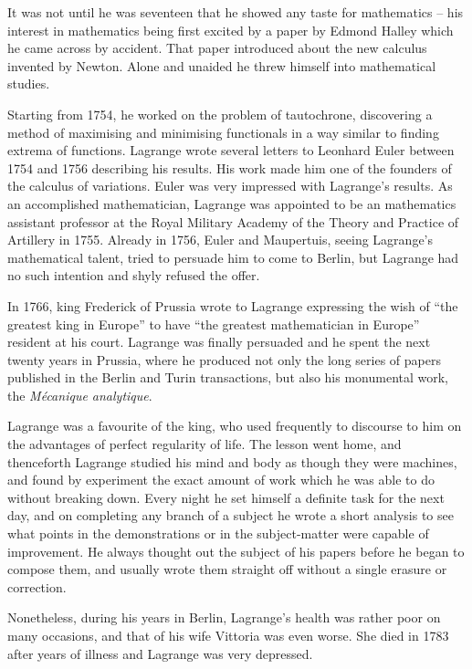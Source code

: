 \documentclass{article}
\begin{document}
It was not until he was seventeen that he showed any taste for mathematics – his interest in mathematics being first excited by a paper by Edmond Halley which he came across by accident. That paper introduced about the new calculus invented by Newton. Alone and unaided he threw himself into mathematical studies.

Starting from 1754, he worked on the problem of tautochrone, discovering a method of maximising and minimising functionals in a way similar to finding extrema of functions. Lagrange wrote several letters to Leonhard Euler between 1754 and 1756 describing his results. His work made him one of the founders of the calculus of variations. Euler was very impressed with Lagrange's results. As an accomplished mathematician, Lagrange was appointed to be an mathematics assistant professor at the Royal Military Academy of the Theory and Practice of Artillery in 1755. Already in 1756, Euler and Maupertuis, seeing Lagrange's mathematical talent, tried to persuade him to come to Berlin, but Lagrange had no such intention and shyly refused the offer.

In 1766, king Frederick of Prussia wrote to Lagrange expressing the wish of ``the greatest king in Europe'' to have ``the greatest mathematician in Europe'' resident at his court. Lagrange was finally persuaded and he spent the next twenty years in Prussia, where he produced not only the long series of papers published in the Berlin and Turin transactions, but also his monumental work, the {\em Mécanique analytique}.

Lagrange was a favourite of the king, who used frequently to discourse to him on the advantages of perfect regularity of life. The lesson went home, and thenceforth Lagrange studied his mind and body as though they were machines, and found by experiment the exact amount of work which he was able to do without breaking down. Every night he set himself a definite task for the next day, and on completing any branch of a subject he wrote a short analysis to see what points in the demonstrations or in the subject-matter were capable of improvement. He always thought out the subject of his papers before he began to compose them, and usually wrote them straight off without a single erasure or correction.

Nonetheless, during his years in Berlin, Lagrange's health was rather poor on many occasions, and that of his wife Vittoria was even worse. She died in 1783 after years of illness and Lagrange was very depressed.
\end{document}
